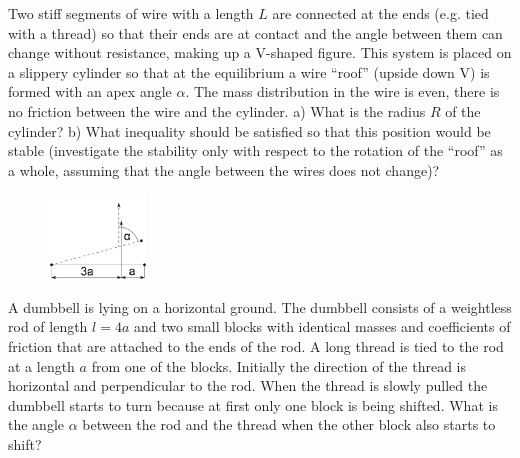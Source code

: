 \documentclass[11pt]{article}
\begin{document}

\probeng
Two stiff segments of wire with a length $L$ are connected at the ends (e.g. tied with a thread) so that their ends are at contact and the angle between them can change without resistance, making up a V-shaped figure. This system is placed on a slippery cylinder so that at the equilibrium a wire “roof” (upside down V) is formed with an apex angle $\alpha$. The mass distribution in the wire is even, there is no friction between the wire and the cylinder. a) What is the radius $R$ of the cylinder? b) What inequality should be satisfied so that this position would be stable (investigate the stability only with respect to the rotation of the “roof” as a whole, assuming that the angle between the wires does not change)?
\probend
\bigskip


\probeng
\begin{figure}%
\vspace{-5 pt}%
\includegraphics[width=0.23\textwidth]{2015-v3g-09-hantel}%
\vspace{-15 pt}%
\end{figure}
A dumbbell is lying on a horizontal ground. The dumbbell consists of a weightless rod of length $l=4a$ and two small blocks with identical masses and coefficients of friction that are attached to the ends of the rod. A long thread is tied to the rod at a length $a$ from one of the blocks. Initially the direction of the thread is horizontal and perpendicular to the rod. When the thread is slowly pulled the dumbbell starts to turn because at first only one block is being shifted. What is the angle $\alpha$ between the rod and the thread when the other block also starts to shift?
\probend
\bigskip
\newpage\subsection{\protect{}}
\end{document}
